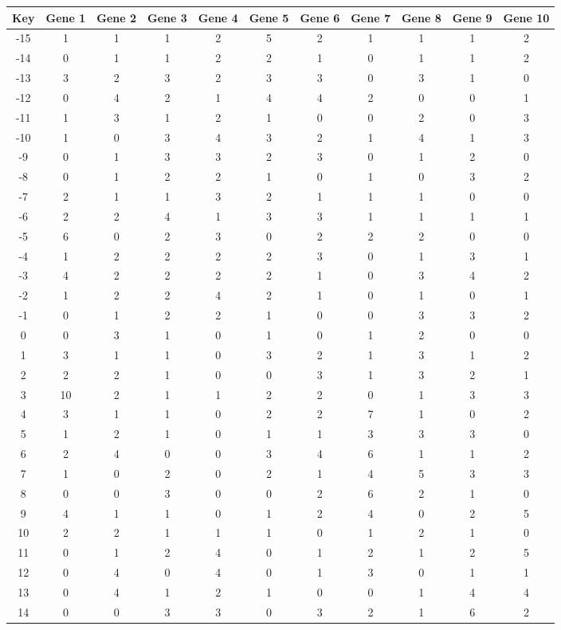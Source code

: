 \begin{tabular}{|c|c|c|c|c|c|c|c|c|c|c|}
\hline
Key & Gene 1 & Gene 2 & Gene 3 & Gene 4 & Gene 5 & Gene 6 & Gene 7 & Gene 8 & Gene 9 & Gene 10 \\
\hline
-15 & 1 & 1 & 1 & 2 & 5 & 2 & 1 & 1 & 1 & 2 \\
-14 & 0 & 1 & 1 & 2 & 2 & 1 & 0 & 1 & 1 & 2 \\
-13 & 3 & 2 & 3 & 2 & 3 & 3 & 0 & 3 & 1 & 0 \\
-12 & 0 & 4 & 2 & 1 & 4 & 4 & 2 & 0 & 0 & 1 \\
-11 & 1 & 3 & 1 & 2 & 1 & 0 & 0 & 2 & 0 & 3 \\
-10 & 1 & 0 & 3 & 4 & 3 & 2 & 1 & 4 & 1 & 3 \\
-9 & 0 & 1 & 3 & 3 & 2 & 3 & 0 & 1 & 2 & 0 \\
-8 & 0 & 1 & 2 & 2 & 1 & 0 & 1 & 0 & 3 & 2 \\
-7 & 2 & 1 & 1 & 3 & 2 & 1 & 1 & 1 & 0 & 0 \\
-6 & 2 & 2 & 4 & 1 & 3 & 3 & 1 & 1 & 1 & 1 \\
-5 & 6 & 0 & 2 & 3 & 0 & 2 & 2 & 2 & 0 & 0 \\
-4 & 1 & 2 & 2 & 2 & 2 & 3 & 0 & 1 & 3 & 1 \\
-3 & 4 & 2 & 2 & 2 & 2 & 1 & 0 & 3 & 4 & 2 \\
-2 & 1 & 2 & 2 & 4 & 2 & 1 & 0 & 1 & 0 & 1 \\
-1 & 0 & 1 & 2 & 2 & 1 & 0 & 0 & 3 & 3 & 2 \\
0 & 0 & 3 & 1 & 0 & 1 & 0 & 1 & 2 & 0 & 0 \\
1 & 3 & 1 & 1 & 0 & 3 & 2 & 1 & 3 & 1 & 2 \\
2 & 2 & 2 & 1 & 0 & 0 & 3 & 1 & 3 & 2 & 1 \\
3 & 10 & 2 & 1 & 1 & 2 & 2 & 0 & 1 & 3 & 3 \\
4 & 3 & 1 & 1 & 0 & 2 & 2 & 7 & 1 & 0 & 2 \\
5 & 1 & 2 & 1 & 0 & 1 & 1 & 3 & 3 & 3 & 0 \\
6 & 2 & 4 & 0 & 0 & 3 & 4 & 6 & 1 & 1 & 2 \\
7 & 1 & 0 & 2 & 0 & 2 & 1 & 4 & 5 & 3 & 3 \\
8 & 0 & 0 & 3 & 0 & 0 & 2 & 6 & 2 & 1 & 0 \\
9 & 4 & 1 & 1 & 0 & 1 & 2 & 4 & 0 & 2 & 5 \\
10 & 2 & 2 & 1 & 1 & 1 & 0 & 1 & 2 & 1 & 0 \\
11 & 0 & 1 & 2 & 4 & 0 & 1 & 2 & 1 & 2 & 5 \\
12 & 0 & 4 & 0 & 4 & 0 & 1 & 3 & 0 & 1 & 1 \\
13 & 0 & 4 & 1 & 2 & 1 & 0 & 0 & 1 & 4 & 4 \\
14 & 0 & 0 & 3 & 3 & 0 & 3 & 2 & 1 & 6 & 2 \\
\hline
\end{tabular}